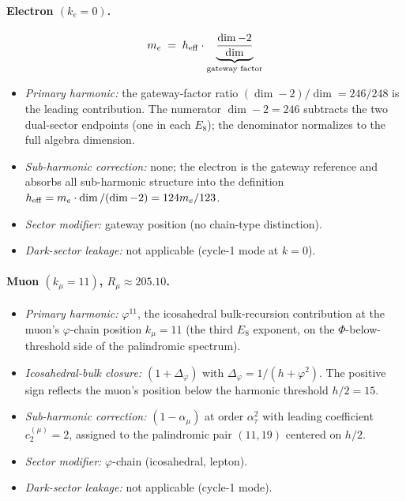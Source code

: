 ﻿\documentclass[reprint,amsmath,amssymb,aps,prd,longbibliography,floatfix]{revtex4-2}
\begin{document}
\paragraph{Electron $(k_e = 0)$.}
$$
m_e \;=\; h_{\rm eff} \cdot \underbrace{\frac{\dim - 2}{\dim}}_{\text{gateway factor}}
$$
\begin{itemize}
\item \emph{Primary harmonic:} the gateway-factor ratio
$(\dim-2)/\dim = 246/248$ is the leading contribution. The numerator
$\dim - 2 = 246$ subtracts the two dual-sector endpoints (one in each
$E_8$); the denominator normalizes to the full algebra dimension.
\item \emph{Sub-harmonic correction:} none; the electron is the
gateway reference and absorbs all sub-harmonic structure into the
definition $h_{\rm eff} = m_e \cdot \dim/(\dim-2) = 124 m_e/123$.
\item \emph{Sector modifier:} gateway position (no chain-type
distinction).
\item \emph{Dark-sector leakage:} not applicable (cycle-1 mode at
$k = 0$).
\end{itemize}

\paragraph{Muon $(k_\mu = 11)$, $R_\mu \approx 205.10$.}
\begin{itemize}
\item \emph{Primary harmonic:} $\varphi^{11}$, the icosahedral
bulk-recursion contribution at the muon's $\varphi$-chain position
$k_\mu = 11$ (the third $E_8$ exponent, on the
$\Phi$-below-threshold side of the palindromic spectrum).
\item \emph{Icosahedral-bulk closure:} $(1 + \Delta_\varphi)$ with
$\Delta_\varphi = 1/(h + \varphi^2)$. The positive sign reflects
the muon's position below the harmonic threshold $h/2 = 15$.
\item \emph{Sub-harmonic correction:} $(1 - \alpha_\mu)$ at order
$\alpha_\tau^2$ with leading coefficient $c_2^{(\mu)} = 2$, assigned to
the palindromic pair
$(11, 19)$ centered on $h/2$.
\item \emph{Sector modifier:} $\varphi$-chain (icosahedral, lepton).
\item \emph{Dark-sector leakage:} not applicable (cycle-1 mode).
\end{itemize}
\end{document}
